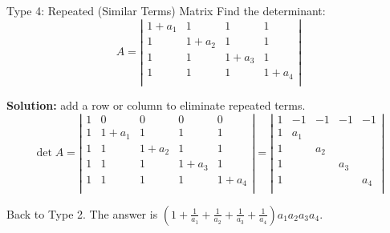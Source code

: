 \documentclass{beamer}
\begin{document}
\begin{frame}{Type 4: Repeated (Similar Terms) Matrix}
Find the determinant:
\begin{equation*}
    A=\left| \begin{matrix}
        1+a_1&		1&		1&		1		\\
        1&		1+a_2&		1&		1		\\
        1&		1&		1+a_3&		1		\\
        1&		1&		1&		1+a_4		\\
    \end{matrix} \right|
\end{equation*}

\textbf{Solution:} add a row or column to eliminate repeated terms.
\begin{equation*}
    \det A=\left| \begin{matrix}
        1&		0&		0&		0&		0\\
        1&		1+a_1&		1&		1&		1\\
        1&		1&		1+a_2&		1&		1\\
        1&		1&		1&		1+a_3&		1\\
        1&		1&		1&		1&		1+a_4\\
    \end{matrix} \right|=\left| \begin{matrix}
        1&		-1&		-1&		-1&		-1\\
        1&		a_1&		&		&		\\
        1&		&		a_2&		&		\\
        1&		&		&		a_3&		\\
        1&		&		&		&		a_4\\
    \end{matrix} \right|
\end{equation*}

Back to Type 2. The answer is $\left( 1+\frac{1}{a_1}+\frac{1}{a_2}+\frac{1}{a_3}+\frac{1}{a_4} \right) a_1a_2a_3a_4$.
\end{frame}
\end{document}
